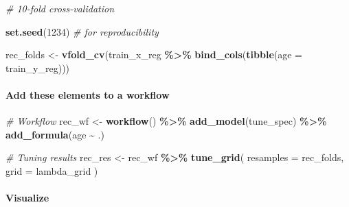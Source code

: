 \documentclass[
]{book}
\newenvironment{Shaded}{\begin{snugshade}}{\end{snugshade}}
\newcommand{\CommentTok}[1]{\textcolor[rgb]{0.56,0.35,0.01}{\textit{#1}}}
\newcommand{\DataTypeTok}[1]{\textcolor[rgb]{0.13,0.29,0.53}{#1}}
\newcommand{\DecValTok}[1]{\textcolor[rgb]{0.00,0.00,0.81}{#1}}
\newcommand{\KeywordTok}[1]{\textcolor[rgb]{0.13,0.29,0.53}{\textbf{#1}}}
\newcommand{\NormalTok}[1]{#1}
\newcommand{\OperatorTok}[1]{\textcolor[rgb]{0.81,0.36,0.00}{\textbf{#1}}}
\newcommand{\StringTok}[1]{\textcolor[rgb]{0.31,0.60,0.02}{#1}}
\begin{document}
\begin{Shaded}
\begin{Highlighting}[]
\CommentTok{\# 10{-}fold cross{-}validation}

\KeywordTok{set.seed}\NormalTok{(}\DecValTok{1234}\NormalTok{) }\CommentTok{\# for reproducibility}

\NormalTok{rec\_folds \textless{}{-}}\StringTok{ }\KeywordTok{vfold\_cv}\NormalTok{(train\_x\_reg }\OperatorTok{\%\textgreater{}\%}\StringTok{ }\KeywordTok{bind\_cols}\NormalTok{(}\KeywordTok{tibble}\NormalTok{(}\DataTypeTok{age =}\NormalTok{ train\_y\_reg)))}
\end{Highlighting}
\end{Shaded}

\hypertarget{add-these-elements-to-a-workflow}{%
\paragraph{Add these elements to a workflow}\label{add-these-elements-to-a-workflow}}

\begin{Shaded}
\begin{Highlighting}[]
\CommentTok{\# Workflow}
\NormalTok{rec\_wf \textless{}{-}}\StringTok{ }\KeywordTok{workflow}\NormalTok{() }\OperatorTok{\%\textgreater{}\%}
\StringTok{  }\KeywordTok{add\_model}\NormalTok{(tune\_spec) }\OperatorTok{\%\textgreater{}\%}
\StringTok{  }\KeywordTok{add\_formula}\NormalTok{(age }\OperatorTok{\textasciitilde{}}\StringTok{ }\NormalTok{.)}
\end{Highlighting}
\end{Shaded}

\begin{Shaded}
\begin{Highlighting}[]
\CommentTok{\# Tuning results}
\NormalTok{rec\_res \textless{}{-}}\StringTok{ }\NormalTok{rec\_wf }\OperatorTok{\%\textgreater{}\%}
\StringTok{  }\KeywordTok{tune\_grid}\NormalTok{(}
    \DataTypeTok{resamples =}\NormalTok{ rec\_folds,}
    \DataTypeTok{grid =}\NormalTok{ lambda\_grid}
\NormalTok{  )}
\end{Highlighting}
\end{Shaded}

\hypertarget{visualize}{%
\paragraph{Visualize}\label{visualize}}
\end{document}

